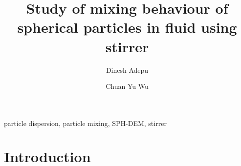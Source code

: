 \documentclass[preprint,12pt]{elsarticle}
\begin{document}
\begin{frontmatter}

  \title{Study of mixing behaviour of spherical particles in fluid using stirrer}
  \author[XXX]{Dinesh Adepu}
  \author[University of Surrey]{Chuan Yu Wu}
\address[xxx]{xxx}



\begin{abstract}

\end{abstract}

\begin{keyword}
{particle dispersion}, {particle mixing}, {SPH-DEM}, {stirrer}


\end{keyword}

\end{frontmatter}



\FloatBarrier%
\section{Introduction}
\end{document}
